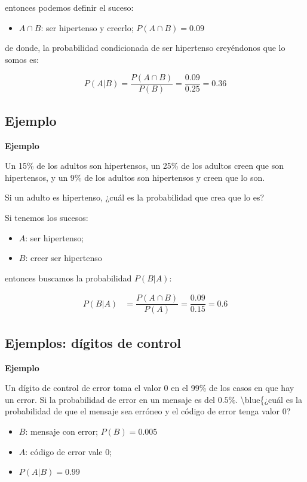 \documentclass[]{book}
\providecommand{\tightlist}{%
  \setlength{\itemsep}{0pt}\setlength{\parskip}{0pt}}
\begin{document}
entonces podemos definir el suceso:

\begin{itemize}
\tightlist
\item
  \(A\cap B\): ser hipertenso y creerlo; \(P(A\cap B)=0.09\)
\end{itemize}

de donde, la probabilidad condicionada de ser hipertenso creyéndonos que lo somos es:

\[P(A|B)=\dfrac{P(A\cap B)}{P(B)}=\dfrac{0.09}{0.25}=0.36\]

\hypertarget{ejemplo-1}{%
\subsection{Ejemplo}\label{ejemplo-1}}

\textbf{Ejemplo}

Un 15\% de los adultos son hipertensos, un 25\% de los adultos creen que son hipertensos, y un 9\% de los adultos son hipertensos y creen que lo son.

Si un adulto es hipertenso, ¿cuál es la probabilidad que crea que lo es?

Si tenemos los sucesos:

\begin{itemize}
\tightlist
\item
  \(A\): ser hipertenso;
\item
  \(B\): creer ser hipertenso
\end{itemize}

entonces buscamos la probabilidad \(P(B|A)\):

\[
\begin{array}{rl}
P(B|A) & =\dfrac{P(A\cap B)}{P(A)}=\dfrac{0.09}{0.15}=
0.6
\end{array}
\]

\hypertarget{ejemplos-duxedgitos-de-control}{%
\subsection{Ejemplos: dígitos de control}\label{ejemplos-duxedgitos-de-control}}

\textbf{Ejemplo}

Un dígito de control de error toma el valor 0 en el 99\% de los casos en que hay un error. Si la probabilidad de error en un mensaje es del \(0.5\%\). \textbackslash{}blue\{¿cuál es la probabilidad de que el mensaje sea erróneo y el código de error tenga valor 0?

\begin{itemize}
\tightlist
\item
  \(B\): mensaje con error; \(P(B)=0.005\)
\item
  \(A\): código de error vale 0;
\item
  \(P(A|B)=0.99\)
\end{itemize}
\end{document}
